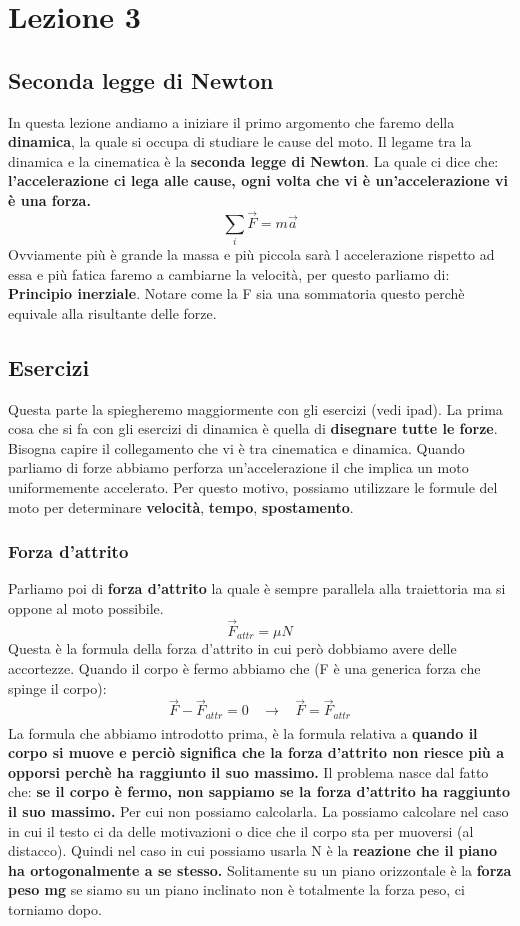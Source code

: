 \documentclass{article}
\numberwithin{equation}{subsection}
\begin{document}
\section{Lezione 3}
\subsection{Seconda legge di Newton}
In questa lezione andiamo a iniziare il primo argomento che faremo della \textbf{dinamica}, la quale si occupa di studiare le cause del moto. Il legame tra la dinamica e la cinematica è la \textbf{seconda legge di Newton}. La quale ci dice che: \textbf{l'accelerazione ci lega alle cause, ogni volta che vi è un'accelerazione vi è una forza.}
\begin{equation}
    \sum_i\vec{F}=m\vec{a}
\end{equation}
Ovviamente più è grande la massa e più piccola sarà l accelerazione rispetto ad essa e più fatica faremo a cambiarne la velocità, per questo parliamo di: \textbf{Principio inerziale}. Notare come la F sia una sommatoria questo perchè equivale alla risultante delle forze. 
\subsection{Esercizi}
Questa parte la spiegheremo maggiormente con gli esercizi (vedi ipad). La prima cosa che si fa con gli esercizi di dinamica è quella di \textbf{disegnare tutte le forze}. Bisogna capire il collegamento che vi è tra cinematica e dinamica. Quando parliamo di forze abbiamo perforza un'accelerazione il che implica un moto uniformemente accelerato. Per questo motivo, possiamo utilizzare le formule del moto per determinare \textbf{velocità}, \textbf{tempo}, \textbf{spostamento}. 
\subsubsection{Forza d'attrito}
Parliamo poi di \textbf{forza d'attrito} la quale è sempre parallela alla traiettoria ma si oppone al moto possibile.
\begin{equation}
    \vec{F}_{attr}=\mu N
\end{equation}
Questa è la formula della forza d'attrito in cui però dobbiamo avere delle accortezze. Quando il corpo è fermo abbiamo che (F è una generica forza che spinge il corpo):
\begin{equation}
    \vec{F}-\vec{F}_{attr}=0 \ \ \ \ \xrightarrow[]{} \ \ \ \ \vec{F}=\vec{F}_{attr}
\end{equation}
La formula che abbiamo introdotto prima, è la formula relativa a \textbf{quando il corpo si muove e perciò significa che la forza d'attrito non riesce più a opporsi perchè ha raggiunto il suo massimo.} Il problema nasce dal fatto che: \textbf{se il corpo è fermo, non sappiamo se la forza d'attrito ha raggiunto il suo massimo.} Per cui non possiamo calcolarla. La possiamo calcolare nel caso in cui il testo ci da delle motivazioni o dice che il corpo sta per muoversi (al distacco). Quindi nel caso in cui possiamo usarla N è la \textbf{reazione che il piano ha ortogonalmente a se stesso.} Solitamente su un piano orizzontale è la \textbf{forza peso mg} se siamo su un piano inclinato non è totalmente la forza peso, ci torniamo dopo. 
\end{document}
